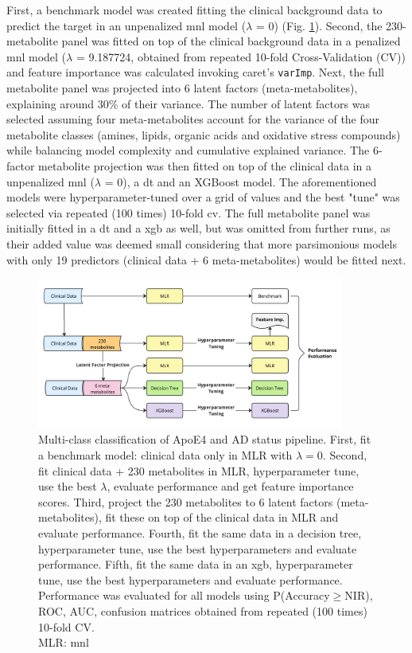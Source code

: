 \documentclass{amsart}
\begin{document}
First, a benchmark model was created fitting the clinical background data to predict the target in an unpenalized \acrshort{mnl} model ($\lambda$ = 0) (Fig. \ref{fig:flow}). Second, the 230-metabolite panel was fitted on top of the clinical background data in a penalized \acrshort{mnl} model ($\lambda$ = 9.187724, obtained from repeated 10-fold Cross-Validation (CV)) and feature importance was calculated invoking \textsf{caret}'s \texttt{varImp}. Next, the full metabolite panel was projected into 6 latent factors (meta-metabolites), explaining around 30\% of their variance. The number of latent factors was selected assuming four meta-metabolites account for the variance of the four metabolite classes (amines, lipids, organic acids and oxidative stress compounds) while balancing model complexity and cumulative explained variance. The 6-factor metabolite projection was then fitted on top of the clinical data in a unpenalized \acrshort{mnl} ($\lambda$ = 0), a \acrlong{dt} and an XGBoost model. The aforementioned models were hyperparameter-tuned over a grid of values and the best "tune" was selected via repeated (100 times) 10-fold \acrshort{cv}. The full metabolite panel was initially fitted in a \acrshort{dt} and a \acrshort{xgb} as well, but was omitted from further runs, as their added value was deemed small considering that more parsimonious models with only 19 predictors (clinical data + 6 meta-metabolites) would be fitted next.
\begin{figure}[ht]
  \includegraphics[width=0.9\textwidth]{figures/flowchart.pdf}
  \caption{\label{fig:flow} Multi-class classification of ApoE4 and AD status pipeline. First, fit a benchmark model: clinical data only in MLR with $\lambda=0$. Second, fit clinical data + 230 metabolites in MLR, hyperparameter tune, use the best $\lambda$, evaluate performance and get feature importance scores. Third, project the 230 metabolites to 6 latent factors (meta-metabolites), fit these on top of the clinical data in MLR and evaluate performance. Fourth, fit the same data in a decision tree, hyperparameter tune, use the best hyperparameters and evaluate performance. Fifth, fit the same data in an \acrfull{xgb}, hyperparameter tune, use the best hyperparameters and evaluate performance. Performance was evaluated for all models using P(Accuracy$\geq$NIR), ROC, AUC, confusion matrices obtained from repeated (100 times) 10-fold CV.\\
  MLR: \acrlong{mnl}}
\end{figure}\\
\end{document}
